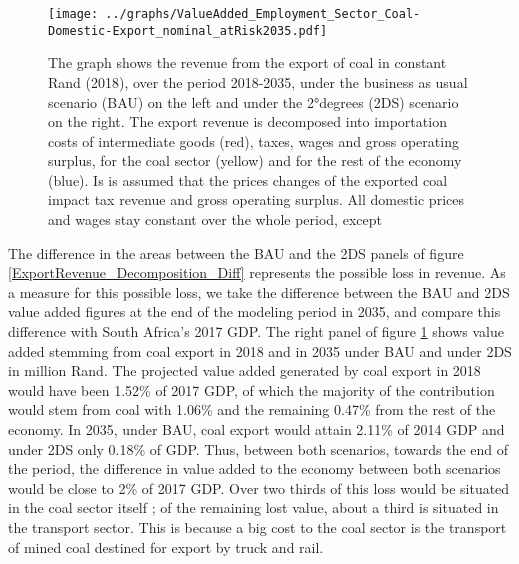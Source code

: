 \documentclass[12pt,english]{article}
\begin{document}
\begin{figure}[!t]
	\centering
	\hspace{-10pt}\texttt{[image: ../graphs/ValueAdded\_Employment\_Sector\_Coal-Domestic-Export\_nominal\_atRisk2035.pdf]}
	\caption{\label{ValueAdded_Employment_Sector_Coal-Export_BAU_2DS}\small The graph shows the revenue from the export of coal in constant Rand (2018), over the period 2018-2035, under the business as usual scenario (BAU) on the left and under the 2°degrees (2DS) scenario on the right. The export revenue is decomposed into importation costs of intermediate goods (red), taxes, wages and gross operating surplus, for the coal sector (yellow) and for the rest of the economy (blue). Is is assumed that the prices changes of the exported coal impact tax revenue and gross operating surplus. All domestic prices and wages stay constant over the whole period, except }
\end{figure}

The difference in the areas between the BAU and the 2DS panels of figure \ref{ExportRevenue_Decomposition_Diff} represents the possible loss in revenue. As a measure for this possible loss, we take the difference between the BAU and 2DS value added figures at the end of the modeling period in 2035, and compare this difference with South Africa's 2017 GDP. %
The right panel of figure \ref{ValueAdded_Employment_Sector_Coal-Export_BAU_2DS} shows value added stemming from coal export in 2018 and in 2035 under BAU and under 2DS in million Rand. %
The projected value added generated by coal export in 2018 would have been 1.52\% of 2017 GDP, of which the majority of the contribution would stem from coal with 1.06\% and the remaining 0.47\% from the rest of the economy. In 2035, under BAU, coal export would attain 2.11\% of 2014 GDP and under 2DS only 0.18\% of GDP. Thus, between both scenarios, towards the end of the period, the difference in value added to the economy between both scenarios would be close to 2\% of 2017 GDP. Over two thirds of this loss would be situated in the coal sector itself ; of the remaining lost value, about a third is situated in the transport sector. This is because a big cost to the coal sector is the transport of mined coal destined for export by truck and rail. 
\end{document}

